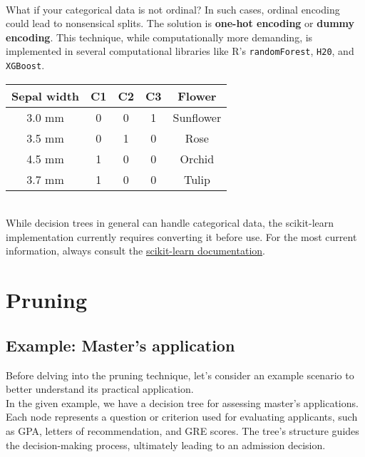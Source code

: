\documentclass[10pt,a4paper]{report}
\begin{document}
\paragraph{}What if your categorical data is not ordinal? In such cases, ordinal encoding could lead to nonsensical splits. The solution is \textbf{one-hot encoding} or \textbf{dummy encoding}. This technique, while computationally more demanding, is implemented in several computational libraries like R's \texttt{randomForest}, \texttt{H20}, and \texttt{XGBoost}.\\
\begin{center}

\begin{tabular}{ |c|c|c|c|c| } 
\hline
Sepal width&{\color{Plum}C1}&{\color{red}C2}&{\color{yellow}C3}& Flower\\\hline\hline
3.0 mm & 0&0&1& Sunflower \\\hline
3.5 mm & 0&1&0& Rose \\\hline
4.5 mm & 1&0&0& Orchid\\\hline
3.7 mm & 1&0&0& Tulip\\\hline
\end{tabular}
\end{center}
\\
While decision trees in general can handle categorical data, the scikit-learn implementation currently requires converting it before use. For the most current information, always consult the \href{https://scikit-learn.org/stable/modules/tree.html#tree-algorithms}{scikit-learn documentation}.
\section{Pruning}
\subsection{Example: Master's application}
Before delving into the pruning technique, let's consider an example scenario to better understand its practical application.\\
In the given example, we have a decision tree for assessing master's applications. Each node represents a question or criterion used for evaluating applicants, such as GPA, letters of recommendation, and GRE scores. The tree's structure guides the decision-making process, ultimately leading to an admission decision.
\end{document}
